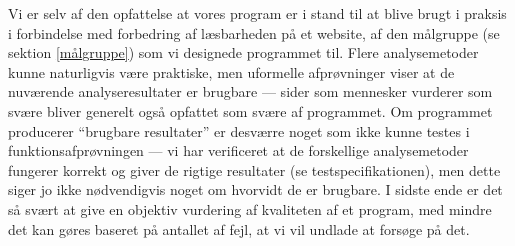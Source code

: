 \documentclass[a4paper,oneside]{memoir}
\begin{document}
Vi er selv af den opfattelse at vores program er i stand til at blive
brugt i praksis i forbindelse med forbedring af læsbarheden på et
website, af den målgruppe (se sektion \ref{målgruppe}) som vi
designede programmet til. Flere analysemetoder kunne naturligvis være
praktiske, men uformelle afprøvninger viser at de nuværende
analyseresultater er brugbare --- sider som mennesker vurderer som
svære bliver generelt også opfattet som svære af programmet. Om
programmet producerer ``brugbare resultater'' er desværre noget som
ikke kunne testes i funktionsafprøvningen --- vi har verificeret at de
forskellige analysemetoder fungerer korrekt og giver de rigtige
resultater (se testspecifikationen), men dette siger jo ikke
nødvendigvis noget om hvorvidt de er brugbare. I sidste ende er det så
svært at give en objektiv vurdering af kvaliteten af et program, med
mindre det kan gøres baseret på antallet af fejl, at vi vil undlade at
forsøge på det.


\end{document}
